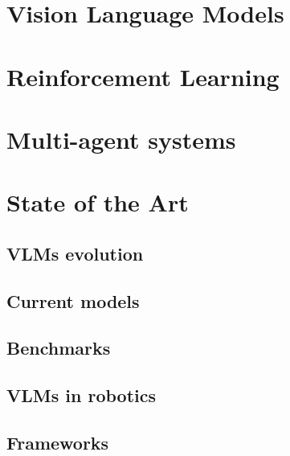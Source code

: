 \section{Vision Language Models}

\section{Reinforcement Learning}

\section{Multi-agent systems}

\section{State of the Art}

\subsection{VLMs evolution}

\subsection{Current models}

\subsection{Benchmarks}

\subsection{VLMs in robotics}

\subsection{Frameworks}